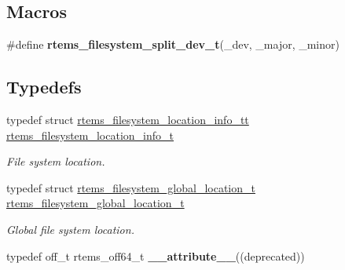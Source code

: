 \subsection*{Macros}
\begin{DoxyCompactItemize}
\item 
\#define {\bfseries rtems\+\_\+filesystem\+\_\+split\+\_\+dev\+\_\+t}(\+\_\+dev,  \+\_\+major,  \+\_\+minor)
\end{DoxyCompactItemize}
\subsection*{Typedefs}
\begin{DoxyCompactItemize}
\item 
\mbox{\label{group__LibIO_ga3252b3d31ee3c49ffff0b7604a676864}} 
typedef struct \mbox{\hyperlink{structrtems__filesystem__location__info__tt}{rtems\+\_\+filesystem\+\_\+location\+\_\+info\+\_\+tt}} \mbox{\hyperlink{group__LibIO_ga3252b3d31ee3c49ffff0b7604a676864}{rtems\+\_\+filesystem\+\_\+location\+\_\+info\+\_\+t}}
\begin{DoxyCompactList}\small\item\em File system location. \end{DoxyCompactList}\item 
typedef struct \mbox{\hyperlink{structrtems__filesystem__global__location__t}{rtems\+\_\+filesystem\+\_\+global\+\_\+location\+\_\+t}} \mbox{\hyperlink{group__LibIO_ga69a213a91be2c0d1c6ecda8b49f26e0b}{rtems\+\_\+filesystem\+\_\+global\+\_\+location\+\_\+t}}
\begin{DoxyCompactList}\small\item\em Global file system location. \end{DoxyCompactList}\item 
\mbox{\label{group__LibIO_ga4c56071a17ecfce062e425127add2fba}} 
typedef off\+\_\+t rtems\+\_\+off64\+\_\+t {\bfseries \+\_\+\+\_\+attribute\+\_\+\+\_\+}((deprecated))
\end{DoxyCompactItemize}
